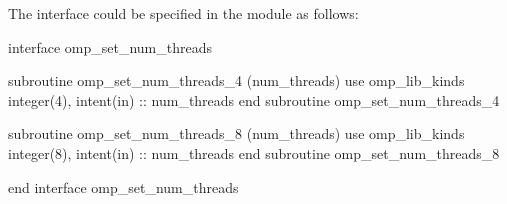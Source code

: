The  interface could be specified in the  module
as follows:

\begin{ompfSubroutine}
interface omp_set_num_threads

    subroutine omp_set_num_threads_4 (num_threads)
      use omp_lib_kinds
      integer(4), intent(in) :: num_threads
    end subroutine omp_set_num_threads_4

    subroutine omp_set_num_threads_8 (num_threads)
      use omp_lib_kinds
      integer(8), intent(in) :: num_threads
    end subroutine omp_set_num_threads_8

end interface omp_set_num_threads
\end{ompfSubroutine}


